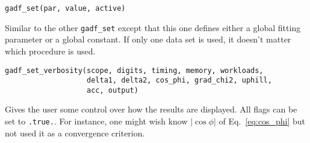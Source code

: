 \documentclass{article}
\begin{document}
\begin{verbatim}
gadf_set(par, value, active)
\end{verbatim}
Similar to the other \verb+gadf_set+ except that this one defines either a global fitting parameter or a global constant. If only one data set is used, it doesn't matter which procedure is used.

\begin{verbatim}
gadf_set_verbosity(scope, digits, timing, memory, workloads,
                   delta1, delta2, cos_phi, grad_chi2, uphill,
                   acc, output)
\end{verbatim}
Gives the user some control over how the results are displayed. All flags can be set to \texttt{.true.}. For instance, one might wish know $|\cos\phi|$ of Eq.~\eqref{eq:cos_phi} but not used it as a convergence criterion.
\end{document}
